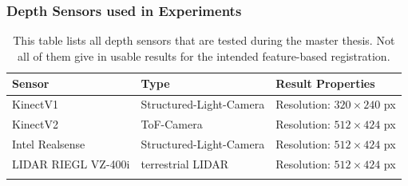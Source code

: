 \subsubsection{Depth Sensors used in Experiments}

\begin{table}
\begin{tabular}{l|l|l}
    Sensor & Type & Result Properties \\
    \hline
    KinectV1 & Structured-Light-Camera & Resolution: $320 \times 240$ px \\
    KinectV2 & \acrshort{ToF}-Camera & Resolution: $512 \times 424$ px \\
    Intel Realsense & Structured-Light-Camera & Resolution: $512 \times 424$ px \\
    LIDAR RIEGL VZ-400i & terrestrial \acrshort{LIDAR} & Resolution: $512 \times 424$ px \\
    \caption[List of tested depth sensors]{This table lists all depth sensors that are tested during the master thesis. Not all of them give in usable results for the intended feature-based registration.}
\end{tabular}
\end{table}
